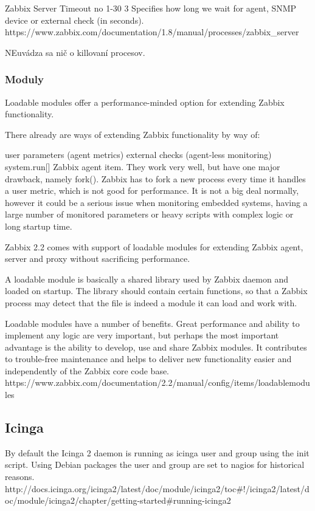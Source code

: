 \documentclass[11pt,final,oneside]{fithesis}
\begin{document}
Zabbix Server
Timeout	 no	 1-30	3	Specifies how long we wait for agent, SNMP device or external check (in seconds).
https://www.zabbix.com/documentation/1.8/manual/processes/zabbix_server

NEuvádza sa nič o killovaní procesov.
\subsubsection{Moduly}

Loadable modules offer a performance-minded option for extending Zabbix functionality.

There already are ways of extending Zabbix functionality by way of:

user parameters (agent metrics)
external checks (agent-less monitoring)
system.run[] Zabbix agent item.
They work very well, but have one major drawback, namely fork(). Zabbix has to fork a new process every time it handles a user metric, which is not good for performance. It is not a big deal normally, however it could be a serious issue when monitoring embedded systems, having a large number of monitored parameters or heavy scripts with complex logic or long startup time.

Zabbix 2.2 comes with support of loadable modules for extending Zabbix agent, server and proxy without sacrificing performance.

A loadable module is basically a shared library used by Zabbix daemon and loaded on startup. The library should contain certain functions, so that a Zabbix process may detect that the file is indeed a module it can load and work with.

Loadable modules have a number of benefits. Great performance and ability to implement any logic are very important, but perhaps the most important advantage is the ability to develop, use and share Zabbix modules. It contributes to trouble-free maintenance and helps to deliver new functionality easier and independently of the Zabbix core code base.
https://www.zabbix.com/documentation/2.2/manual/config/items/loadablemodules


\subsection{Icinga}
By default the Icinga 2 daemon is running as icinga user and group using the init script. Using Debian packages the user and group are set to nagios for historical reasons.
http://docs.icinga.org/icinga2/latest/doc/module/icinga2/toc#!/icinga2/latest/doc/module/icinga2/chapter/getting-started#running-icinga2
\end{document}
